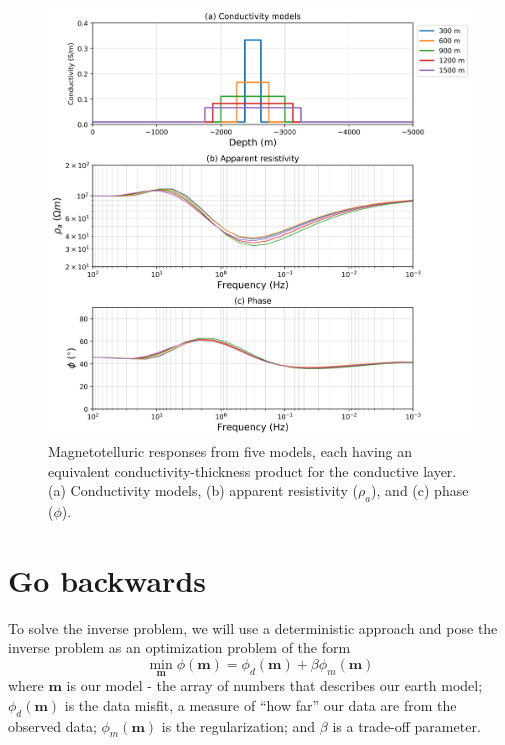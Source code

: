 \documentclass[11pt,oneside]{article}
\begin{document}
\begin{figure}[htb!]
    \centering
    \includegraphics[width=\textwidth]{images/sigmat.png}
\caption{Magnetotelluric responses from five models, each having an equivalent conductivity-thickness product for the conductive layer. (a) Conductivity models, (b) apparent resistivity ($\rho_a$), and (c) phase ($\phi$).}
\label{fig:sigmat}
\end{figure}


\section{Go backwards}

To solve the inverse problem, we will use a deterministic approach and pose the inverse problem as an optimization problem of the form
\begin{equation}
\min_{\mathbf{m}} \phi(\mathbf{m}) = \phi_d(\mathbf{m}) + \beta\phi_m(\mathbf{m})
\end{equation}
where $\mathbf{m}$ is our model - the array of numbers that describes our earth model; $\phi_d(\mathbf{m})$ is the data misfit, a measure of ``how far'' our data are from the observed data; $\phi_m(\mathbf{m})$ is the regularization; and $\beta$ is a trade-off parameter.
\end{document}
